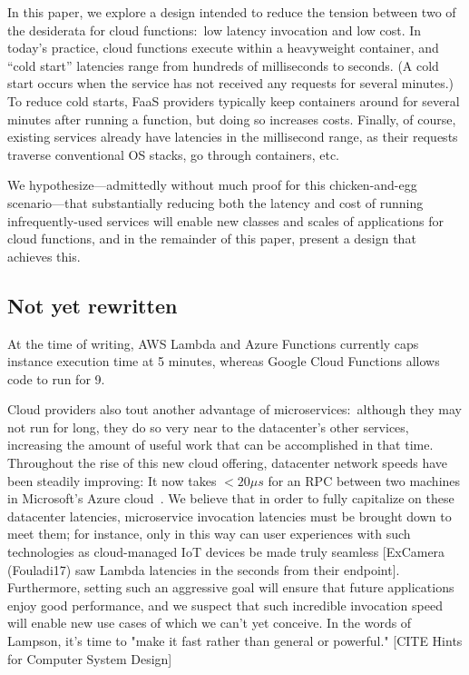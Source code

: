 In this paper, we explore a design intended to reduce the tension between two of
the desiderata for cloud functions:\ low latency invocation and low cost.  In
today's practice, cloud functions execute within a heavyweight container, and
``cold start'' latencies range from hundreds of milliseconds to seconds.  (A
cold start occurs when the service has not received any requests for several
minutes.)  To reduce cold starts, FaaS providers typically keep containers
around for several minutes after running a function, but doing so increases
costs.  Finally, of course, existing services already have latencies in the
millisecond range, as their requests traverse conventional OS stacks, go through
containers, etc.


We hypothesize---admittedly without much proof for this chicken-and-egg
scenario---that substantially reducing both the latency and cost of running
infrequently-used services will enable new classes and scales of applications
for cloud functions, and in the remainder of this paper, present a design that
achieves this.

\subsection{Not yet rewritten}

At the time of writing, AWS Lambda and Azure Functions currently caps instance execution time at 5 minutes, whereas Google Cloud Functions allows code to run for 9.

Cloud providers also tout another advantage of microservices:\ although they may not run for long, they do so very near to the datacenter's other services, increasing the amount of useful work that can be accomplished in that time.
Throughout the rise of this new cloud offering, datacenter network speeds have been steadily improving:
It now takes $<20\mu{}s$ for an RPC between two machines in Microsoft's Azure cloud~\cite{www-firestone-azure-latency}.
We believe that in order to fully capitalize on these datacenter latencies, microservice invocation latencies must be brought down to meet them; for instance, only in this way can user experiences with such technologies as cloud-managed IoT devices be made truly seamless [ExCamera (Fouladi17) saw Lambda latencies in the seconds from their endpoint].
Furthermore, setting such an aggressive goal will ensure that future applications enjoy good performance, and we suspect that such incredible invocation speed will enable new use cases of which we can't yet conceive.
In the words of Lampson, it's time to "make it fast rather than general or powerful." [CITE Hints for Computer System Design]

